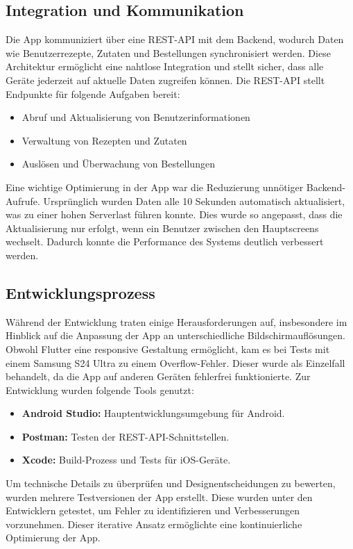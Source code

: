 \subsection{Integration und Kommunikation}
Die App kommuniziert über eine REST-API mit dem Backend, wodurch Daten wie Benutzerrezepte, Zutaten und Bestellungen synchronisiert werden. Diese Architektur ermöglicht eine nahtlose Integration und stellt sicher, dass alle Geräte jederzeit auf aktuelle Daten zugreifen können. Die REST-API stellt Endpunkte für folgende Aufgaben bereit:

\begin{itemize}
    \item Abruf und Aktualisierung von Benutzerinformationen
    \item Verwaltung von Rezepten und Zutaten
    \item Auslösen und Überwachung von Bestellungen
\end{itemize}
Eine wichtige Optimierung in der App war die Reduzierung unnötiger Backend-Aufrufe. Ursprünglich wurden Daten alle 10 Sekunden automatisch aktualisiert, was zu einer hohen Serverlast führen konnte. Dies wurde so angepasst, dass die Aktualisierung nur erfolgt, wenn ein Benutzer zwischen den Hauptscreens wechselt. Dadurch konnte die Performance des Systems deutlich verbessert werden.

\subsection{Entwicklungsprozess}
Während der Entwicklung traten einige Herausforderungen auf, insbesondere im Hinblick auf die Anpassung der App an unterschiedliche Bildschirmauflösungen. Obwohl Flutter eine responsive Gestaltung ermöglicht, kam es bei Tests mit einem Samsung S24 Ultra zu einem Overflow-Fehler. Dieser wurde als Einzelfall behandelt, da die App auf anderen Geräten fehlerfrei funktionierte. Zur Entwicklung wurden folgende Tools genutzt:

\begin{itemize}
    \item \textbf{Android Studio:} Hauptentwicklungsumgebung für Android.
    \item \textbf{Postman:} Testen der REST-API-Schnittstellen.
    \item \textbf{Xcode:} Build-Prozess und Tests für iOS-Geräte.
\end{itemize}
Um technische Details zu überprüfen und Designentscheidungen zu bewerten, wurden mehrere Testversionen der App erstellt. Diese wurden unter den Entwicklern getestet, um Fehler zu identifizieren und Verbesserungen vorzunehmen. Dieser iterative Ansatz ermöglichte eine kontinuierliche Optimierung der App.

